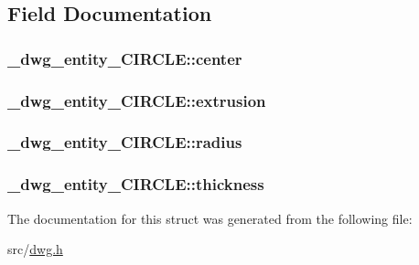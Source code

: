 \subsection{\-Field \-Documentation}
\hypertarget{struct__dwg__entity__CIRCLE_afbe912d9b0965a83ab9f1e24784a048c}{
\subsubsection[{center}]{ {\bf \-\_\-dwg\-\_\-entity\-\_\-\-C\-I\-R\-C\-L\-E\-::center}}}\label{struct__dwg__entity__CIRCLE_afbe912d9b0965a83ab9f1e24784a048c}
\hypertarget{struct__dwg__entity__CIRCLE_a2acd1d0a857da7a82edd77850d4ca292}{
\subsubsection[{extrusion}]{ {\bf \-\_\-dwg\-\_\-entity\-\_\-\-C\-I\-R\-C\-L\-E\-::extrusion}}}\label{struct__dwg__entity__CIRCLE_a2acd1d0a857da7a82edd77850d4ca292}
\hypertarget{struct__dwg__entity__CIRCLE_ad556f8403e68cd19c780af2469eebc2d}{
\subsubsection[{radius}]{ {\bf \-\_\-dwg\-\_\-entity\-\_\-\-C\-I\-R\-C\-L\-E\-::radius}}}\label{struct__dwg__entity__CIRCLE_ad556f8403e68cd19c780af2469eebc2d}
\hypertarget{struct__dwg__entity__CIRCLE_a2acecc76c1bdb2fbc04fcc11479b88e2}{
\subsubsection[{thickness}]{ {\bf \-\_\-dwg\-\_\-entity\-\_\-\-C\-I\-R\-C\-L\-E\-::thickness}}}\label{struct__dwg__entity__CIRCLE_a2acecc76c1bdb2fbc04fcc11479b88e2}


\-The documentation for this struct was generated from the following file\-:\begin{DoxyCompactItemize}
\item 
src/\hyperlink{dwg_8h}{dwg.\-h}\end{DoxyCompactItemize}
